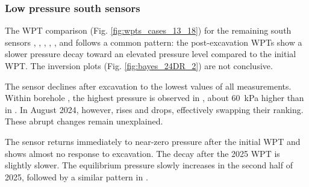 

\subsubsection{Low pressure south sensors}
The WPT comparison (Fig. \ref{fig:wpts_cases_13_18}) for the remaining south sensors
, , , , , and
 follows a common pattern: the post-excavation WPTs show a slower
pressure decay toward an elevated pressure level compared to the initial WPT. The
inversion plots (Fig. \ref{fig:bayes_24DR_2}) are not conclusive.

The sensor  declines after excavation to the lowest values of all measurements.
Within borehole , the highest pressure is observed in , about
60~kPa higher than in . In August 2024, however,  rises and
 drops, effectively swapping their ranking. These abrupt changes remain
unexplained.

The sensor  returns immediately to near-zero pressure after the initial
WPT and shows almost no response to excavation. The decay after the 2025 WPT is
slightly slower. The equilibrium pressure slowly increases in the second half of
2025, followed by a similar pattern in .



